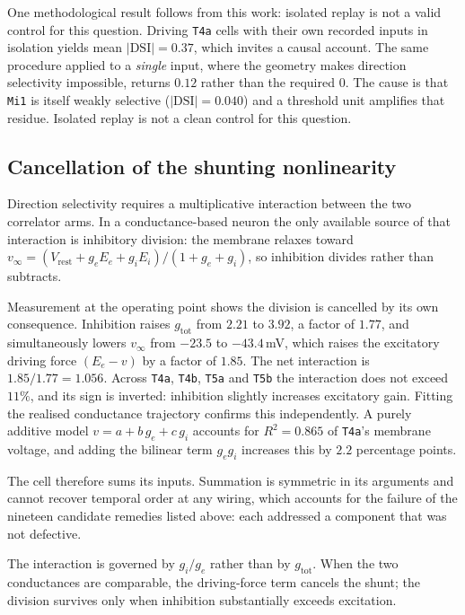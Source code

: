 \documentclass[10pt,twoside]{article}
\newcommand{\cell}[1]{\texttt{#1}}
\begin{document}
One methodological result follows from this work: isolated replay is not a
valid control for this question. Driving \cell{T4a} cells with their own
recorded inputs in isolation yields mean $|\mathrm{DSI}|=0.37$, which invites a
causal account. The same procedure applied to a \emph{single} input, where the
geometry makes direction selectivity impossible, returns $0.12$ rather than the
required $0$. The cause is that \cell{Mi1} is itself weakly selective
($|\mathrm{DSI}|=0.040$) and a threshold unit amplifies that residue. Isolated
replay is not a clean control for this question.

\subsection{Cancellation of the shunting nonlinearity}
\label{sec:shunt}

Direction selectivity requires a multiplicative interaction between the two
correlator arms. In a conductance-based neuron the only available source of
that interaction is inhibitory division: the membrane relaxes toward
$v_\infty = (V_{\mathrm{rest}} + g_e E_e + g_i E_i)/(1 + g_e + g_i)$, so
inhibition divides rather than subtracts.

Measurement at the operating point shows the division is cancelled by its own
consequence. Inhibition raises $g_{\mathrm{tot}}$ from $2.21$ to $3.92$, a
factor of $1.77$, and simultaneously lowers $v_\infty$ from $-23.5$ to
$-43.4$\,mV, which raises the excitatory driving force $(E_e - v)$ by a factor
of $1.85$. The net interaction is $1.85/1.77 = 1.056$. Across \cell{T4a},
\cell{T4b}, \cell{T5a} and \cell{T5b} the interaction does not exceed $11\%$,
and its sign is inverted: inhibition slightly increases excitatory gain. Fitting
the realised conductance trajectory confirms this independently. A purely
additive model $v = a + b\,g_e + c\,g_i$ accounts for $R^2 = 0.865$ of
\cell{T4a}'s membrane voltage, and adding the bilinear term $g_e g_i$ increases
this by $2.2$ percentage points.

The cell therefore sums its inputs. Summation is symmetric in its arguments and
cannot recover temporal order at any wiring, which accounts for the failure of
the nineteen candidate remedies listed above: each addressed a component that
was not defective.

The interaction is governed by $g_i/g_e$ rather than by $g_{\mathrm{tot}}$.
When the two conductances are comparable, the driving-force term cancels the
shunt; the division survives only when inhibition substantially exceeds
excitation.
\end{document}
